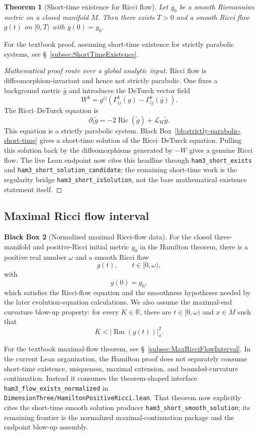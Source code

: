 \documentclass[11pt]{article}
\theoremstyle{plain}
\newtheorem{theorem}{Theorem}[section]
\theoremstyle{definition}
\newtheorem{blackbox}[theorem]{Black Box}
\theoremstyle{remark}
\newcommand{\Ric}{\operatorname{Ric}}
\newcommand{\Rm}{\operatorname{Rm}}
\newcommand{\Lie}{\mathcal L}
\newcommand{\norm}[1]{\left|#1\right|}
\newcommand{\leanref}[1]{\nolinkurl{#1}}
\newcommand{\leanfile}[1]{\nolinkurl{#1}}
\newcommand{\rffile}[1]{\leanfile{#1}}
\begin{document}
\begin{theorem}[Short-time existence for Ricci flow]
\label{thm:rf-short-time-existence}
Let $g_0$ be a smooth Riemannian metric on a closed manifold $M$. Then there
exists $T>0$ and a smooth Ricci flow $g(t)$ on $[0,T)$ with $g(0)=g_0$.
\end{theorem}

For the textbook proof, assuming short-time existence for strictly parabolic
systems, see \S\ \ref{subsec:ShortTimeExistence}.

\begin{proof}[Mathematical proof route over a global analytic input]
Ricci flow is diffeomorphism-invariant and hence not strictly parabolic.  One
fixes a background metric $\bar g$ and introduces the DeTurck vector field
\[
W^k
=
g^{ij}\left(\Gamma^k_{ij}(g)-\Gamma^k_{ij}(\bar g)\right).
\]
The Ricci--DeTurck equation is
\[
\partial_t\tilde g
=
-2\Ric(\tilde g)+\Lie_W\tilde g.
\]
This equation is a strictly parabolic system.  Black
Box~\ref{bb:strictly-parabolic-short-time} gives a short-time solution of the
Ricci--DeTurck equation.  Pulling this solution back by the diffeomorphisms
generated by $-W$ gives a genuine Ricci flow.  The live Lean endpoint now cites
this headline through \leanref{ham3_short_exists} and
\leanref{ham3_short_solution_candidate}; the remaining short-time work is the
regularity bridge \leanref{ham3_short_isSolution}, not the bare mathematical
existence statement itself.
\end{proof}

\subsection{Maximal Ricci flow interval}

\begin{blackbox}[Normalized maximal Ricci-flow data]
\label{bb:maximal-rf-interval}
For the closed three-manifold and positive-Ricci initial metric \(g_0\) in the
Hamilton theorem, there is a positive real number \(\omega\) and a smooth
Ricci flow
\[
  g(t),\qquad t\in[0,\omega),
\]
with
\[
  g(0)=g_0,
\]
which satisfies the Ricci-flow equation and the smoothness hypotheses needed by
the later evolution-equation calculations.  We also assume the maximal-end
curvature blow-up property: for every \(K\in\mathbb R\), there are
\(t\in[0,\omega)\) and \(x\in M\) such that
\[
  K<\norm{\Rm(g(t))}^{2}_{x}.
\]
\end{blackbox}

For the textbook maximal-flow theorem, see \S\
\ref{subsec:MaxRicciFlowInterval}.  In the current Lean organization, the
Hamilton proof does not separately consume short-time existence, uniqueness,
maximal extension, and bounded-curvature continuation.  Instead it consumes the
theorem-shaped interface \leanref{ham3_flow_exists_normalized} in
\rffile{DimensionThree/HamiltonPositiveRicci.lean}.  That theorem now explicitly
cites the short-time smooth solution producer \leanref{ham3_short_smooth_solution};
its remaining frontier is the normalized maximal-continuation package and the
endpoint blow-up assembly.
\end{document}
